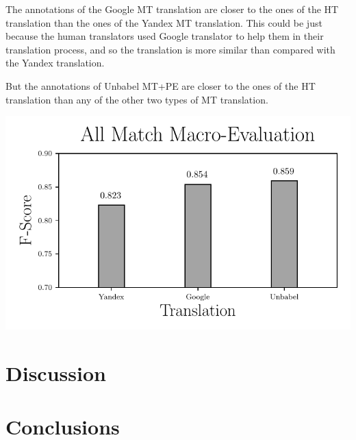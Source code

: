The annotations of the Google MT translation are closer to the ones of the HT translation than the ones of the Yandex MT translation. This could be just because the human translators used Google translator to help them in their translation process, and so the translation is more similar than compared with the Yandex translation. 

But the annotations of Unbabel MT+PE are closer to the ones of the HT translation than any of the other two types of MT translation. 


\includegraphics{SupportFiles/plots/All_Match_Macro_plot.pdf}


\section{Discussion}





\section{Conclusions}




  
